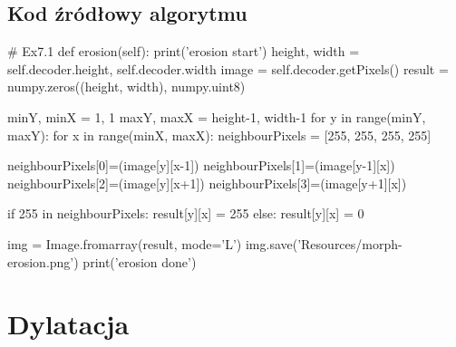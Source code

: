 \documentclass[a4paper,12pt]{book}
\begin{document}
\subsection{Kod źródłowy algorytmu}
\begin{python}
# Ex7.1
def erosion(self):
	print('erosion start')
	height, width = self.decoder.height, self.decoder.width
	image = self.decoder.getPixels()
	result = numpy.zeros((height, width), numpy.uint8)
	
	minY, minX = 1, 1
	maxY, maxX = height-1, width-1
	for y in range(minY, maxY):
		for x in range(minX, maxX):
			neighbourPixels = [255, 255, 255, 255]
	
			neighbourPixels[0]=(image[y][x-1])
			neighbourPixels[1]=(image[y-1][x])
			neighbourPixels[2]=(image[y][x+1])
			neighbourPixels[3]=(image[y+1][x])
	
			if 255 in neighbourPixels:
				result[y][x] = 255
			else:
				result[y][x] = 0
	
	img = Image.fromarray(result, mode='L')
	img.save('Resources/morph-erosion.png')
	print('erosion done')
\end{python}
\section{Dylatacja}
\end{document}
